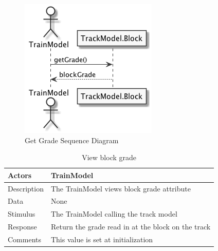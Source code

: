 \documentclass[]{article}
\begin{document}
\begin{figure}[H]
	\centering
	\includegraphics[scale=.5]{getGrade.png}
	\caption{Get Grade Sequence Diagram}
\end{figure}

\begin{table}[H]
	\centering
	\caption{View block grade}
	\begin{tabular}{|l|l|}
		\hline
		Actors & \parbox[t]{10cm}{TrainModel} \\ \hline
		Description & \parbox[t]{10cm}{The TrainModel views block grade attribute} \\ \hline
		Data &  \parbox[t]{10cm}{None} \\ \hline
		Stimulus &  \parbox[t]{10cm}{The TrainModel calling the track model} \\ \hline
		Response & \parbox[t]{10cm}{Return the grade read in at the block on the track}\\ \hline
		Comments & \parbox[t]{10cm}{This value is set at initialization}  \\ \hline
	\end{tabular}
\end{table}
\end{document}
